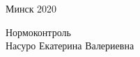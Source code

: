 \begin{titlepage}
    \vfill
    \begin{center}
        Минск 2020
    \end{center}

    \clearpage

    \vspace*{37em}
    \begin{raggedleft}
        \begin{minipage}{8cm}
            Нормоконтроль \\[1em]
            Насуро Екатерина Валериевна\\[1em]
            \null\hrulefill{} \\[1em]
        \end{minipage}
    \end{raggedleft}
\end{titlepage}
